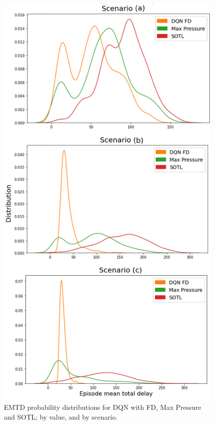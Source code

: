 \documentclass[journal]{IEEEtran}
\begin{document}
\begin{figure}[htbp]
  \begin{center}
    \includegraphics[width=0.9\linewidth,keepaspectratio]{img/results/fd_1.png}  
    \caption{EMTD probability distributions for DQN with FD, Max Pressure and SOTL; by value, and by scenario.}
    \label{fig:fd_1}
  \end{center}
\end{figure}
\end{document}
